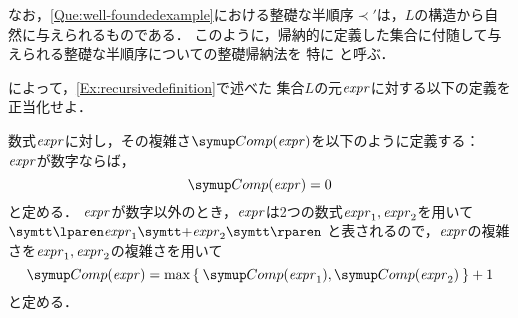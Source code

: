 なお，\cref{Que:well-foundedexample}における整礎な半順序\(\prec'\)は，\(L\)の構造から自然に与えられるものである．
このように，帰納的に定義した集合に付随して与えられる整礎な半順序についての整礎帰納法を
特に%
%
と呼ぶ．

\begin{Que} \label{Que:inductivedifinition}
	によって，\cref{Ex:recursivedefinition}で述べた
	集合\(L\)の元\(\text{\textit{expr}}\)に対する以下の定義を正当化せよ．

	数式\(\text{\textit{expr}}\)に対し，その複雑さ\(\apply{\Comp}{\expr}\)を以下のように定義する：
	\(\text{\textit{expr}}\)が数字ならば，
	\[
		\apply{\Comp}{\expr} = 0
	\]と定める．
	\(\text{\textit{expr}}\)が数字以外のとき，\(\text{\textit{expr}}\)は2つの数式\(\text{\textit{expr}}_1, \text{\textit{expr}}_2\)を用いて\(\obj{\lparen} \expr_1 \obj{+} \expr_2 \obj{\rparen}\)
	と表されるので，\(\text{\textit{expr}}\)の複雑さを\(\text{\textit{expr}}_1, \text{\textit{expr}}_2\)の複雑さを用いて
	\[
		\apply{\Comp}{\expr} = \max\Set{\apply{\Comp}{\expr_1}, \apply{\Comp}{\expr_2}} + 1
	\]と定める．
\end{Que}